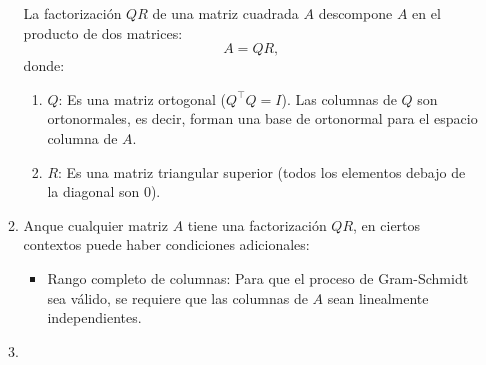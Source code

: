 \begin{enumerate}[label=\color{red}\textbf{\arabic*)}]
\begin{enumerate}[label=\color{red}\textbf{\alph*)}]
            La factorización $QR$ de una matriz cuadrada  $A$ descompone  $A$ en el producto de dos matrices:  \[
            A=QR,
            \] donde:
            \begin{enumerate}[label=\arabic*)]
                \item $Q$: Es una matriz ortogonal ($Q^\intercal Q=I$). Las columnas de $Q$ son ortonormales, es decir, forman una base de ortonormal para el espacio columna de  $A$.
                \item  $R$: Es una matriz triangular superior (todos los elementos debajo de la diagonal son 0).
            \end{enumerate}
        \item {}

            Anque cualquier matriz $A$ tiene una factorización  $QR$, en ciertos contextos puede haber condiciones adicionales:
             \begin{itemize}[label=\textbullet]
                \item Rango completo de columnas: Para que el proceso de Gram-Schmidt sea válido, se requiere que las columnas de $A$ sean linealmente independientes.
            \end{itemize}
        \item {} 


\end{enumerate}
\end{enumerate}
